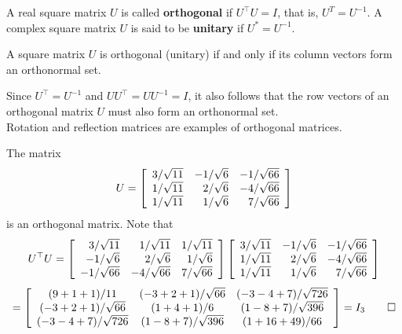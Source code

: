 \begin{Def}  A real square matrix $U$ is called \textbf{orthogonal} if $U^\top U = I$, that is, $U^{T} = U^{-1}$. A complex square matrix $U$ is said to be \textbf{unitary} if $U^* = U^{-1}$.
\end{Def}\vs

\begin{Thm} A square matrix $U$ is orthogonal (unitary) if and only if its column vectors form an orthonormal set.\end{Thm}\vs

Since $U^\top = U^{-1}$ and $UU^\top = UU^{-1} = I$, it also follows that the row vectors of an orthogonal matrix $U$ must also form an orthonormal set.\\

Rotation and reflection matrices are examples of orthogonal matrices.\\

\begin{Exam}\label{exam:1} The matrix 
\[U = \mtx{rrr}{3/\sqrt{11} & -1/\sqrt{6} & -1/\sqrt{66}\\ 1/\sqrt{11} & 2/\sqrt{6} & -4/\sqrt{66}  \\ 1/\sqrt{11} & 1/\sqrt{6} & 7/\sqrt{66}}\] is an orthogonal matrix. Note that 
\[U^\top U = \mtx{rrr}{3/\sqrt{11} & 1/\sqrt{11} & 1/\sqrt{11}\\ -1/\sqrt{6} & 2/\sqrt{6} & 1/\sqrt{6}  \\ -1/\sqrt{66} & -4/\sqrt{66} & 7/\sqrt{66}}\mtx{rrr}{3/\sqrt{11} & -1/\sqrt{6} & -1/\sqrt{66}\\ 1/\sqrt{11} & 2/\sqrt{6} & -4/\sqrt{66}  \\ 1/\sqrt{11} & 1/\sqrt{6} & 7/\sqrt{66}}\] \[= \mtx{ccc}{(9+1+1)/11 & (-3+2+1)/\sqrt{66} & (-3-4+7)/\sqrt{726} \\ (-3+2+1)/\sqrt{66} & (1+4+1)/6 & (1-8+7)/\sqrt{396} \\ (-3-4+7)/\sqrt{726} & (1-8+7)/\sqrt{396} & (1+16+49)/66} = I_3\qedhere\]
\end{Exam}\vs


